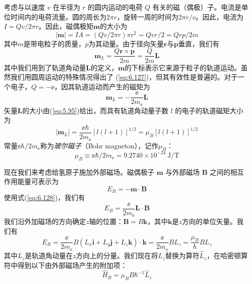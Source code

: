     考虑与以速度 $v$ 在半径为 $r$ 的圆内运动的电荷 $Q$ 有关的磁（偶极）子。电流是单位时间内的电荷流量。圆的周长为$2\pi r$，旋转一周的时间为$2\pi r/v$。因此，电流为$I = Qv/2\pi r$。因此，磁偶极矩$\mathbf{m}$的大小为
    \begin{equation}
        \left|\mathbf{m}\right| = IA = \left(Qv/2\pi r\right)\pi r^2 = Qvr/2 = Qrp/2m
        \label{eq:6.126}
    \end{equation}
    其中$m$是带电粒子的质量，$p$为其动量。由于径向矢量$\mathbf{r}$与$\mathbf{p}$垂直，我们有
    \begin{equation}
        \mathbf{m}_L = \frac{Q\mathbf{r}\times\mathbf{p}}{2m} = \frac{Q}{2m}\mathbf{L}
        \label{eq:6.127}
    \end{equation}
    其中我们用到了轨道角动量$\mathbf{L}$的定义，$\mathbf{m}$的下标表示它来源于粒子的轨道运动。虽然我们用圆周运动的特殊情况得出了 (\ref{eq:6.127})，但其有效性是普遍的。对于一个电子，$Q = -\ee $，因其轨道运动而产生的磁矩为
    \begin{equation}
        \mathbf{m}_L = -\frac{\ee }{2m_{\ee }}\mathbf{L}
        \label{eq:6.128}
    \end{equation}
    矢量$\mathbf{L}$的大小由(\ref{eq:5.95})给出，而具有轨道角动量子数 $l$ 的电子的轨道磁矩大小为
    \begin{equation}
        \left|\mathbf{m}_L\right| = \frac{\ee \hbar}{2m_{\ee }}\left[l\left(l+1\right)\right]^{1/2} = \mu_{B}\left[l\left(l+1\right)\right]^{1/2}
        \label{eq:6.129}
    \end{equation}
    常量$\ee \hbar/2m_{\ee }$称为\textit{玻尔磁子}（Bohr magneton），记作$\mu_{B}$：
    \begin{equation}
        \mu_{B} \equiv \ee \hbar/2m_{\ee } = 9.2740 \times 10^{-24}\: \mathrm{J}/\mathrm{T}
        \label{eq:6.130}
    \end{equation}

    现在我们来考虑给氢原子施加外部磁场。磁偶极子 $\mathbf{m}$ 与外部磁场 $\mathbf{B}$ 之间的相互作用能量可表示为
    \begin{equation}
        E_B = -\mathbf{m}\cdot\mathbf{B}
        \label{eq:6.131}
    \end{equation}
    使用式(\ref{eq:6.128})，我们有
    \begin{equation}
        E_{B} = \frac{\ee }{2m_{\ee }}\mathbf{L}\cdot\mathbf{B}
        \label{eq:6.132}
    \end{equation}
    我们沿外加磁场的方向确定$z$轴的位置：$\mathbf{B} = B\mathbf{k}$，其中$\mathbf{k}$是$z$方向的单位矢量。我们有
    \begin{equation*}
        E_B = \frac{\ee }{2m_{\ee }}B\left(L_x\mathbf{i} + L_y\mathbf{j} + L_z\mathbf{k}\right)\cdot\mathbf{k} = \frac{\ee }{2m_{\ee }}BL_z = \frac{\mu_B}{\hbar}BL_z
    \end{equation*}
    其中$L_z$是轨道角动量在$z$方向上的分量。我们现在将$L_z$替换为算符$\hat{L}_z$，在哈密顿算符中得到以下由外部磁场产生的附加项：
    \begin{equation}
        \hat{H}_B = \mu_BB\hbar^{-1}\hat{L}_z
        \label{eq:6.133}
    \end{equation}

